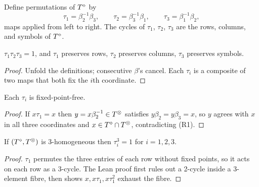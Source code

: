 \begin{definition}\label{def:tau}
  \leanok
  Define permutations of $T^{\diamond}$ by
  \[
    \tau_1 = \beta_2^{-1}\beta_3, \qquad
    \tau_2 = \beta_3^{-1}\beta_1, \qquad
    \tau_3 = \beta_1^{-1}\beta_2,
  \]
  maps applied from left to right. The cycles of $\tau_1$, $\tau_2$, $\tau_3$
  are the rows, columns, and symbols of $T^{\diamond}$.
\end{definition}

\begin{lemma}\label{lem:T1}
  \leanok
  $\tau_1\tau_2\tau_3 = 1$, and $\tau_1$ preserves rows, $\tau_2$ preserves
  columns, $\tau_3$ preserves symbols.
\end{lemma}
\begin{proof}\leanok
  Unfold the definitions; consecutive $\beta$'s cancel. Each $\tau_i$ is a
  composite of two maps that both fix the $i$th coordinate.
\end{proof}

\begin{lemma}\label{lem:T3}
  \leanok
  Each $\tau_i$ is fixed-point-free.
\end{lemma}
\begin{proof}\leanok
  If $x\tau_1 = x$ then $y = x\beta_2^{-1} \in T^{\otimes}$ satisfies
  $y\beta_2 = y\beta_3 = x$, so $y$ agrees with $x$ in all three
  coordinates and $x \in T^{\diamond} \cap T^{\otimes}$, contradicting (R1).
\end{proof}

\begin{lemma}\label{lem:order-three}
  \leanok
  If $(T^{\diamond}, T^{\otimes})$ is 3-homogeneous then $\tau_i^3 = 1$ for
  $i = 1, 2, 3$.
\end{lemma}
\begin{proof}\leanok
  $\tau_1$ permutes the three entries of each row without fixed points,
  so it acts on each row as a 3-cycle. The Lean proof first rules out a
  2-cycle inside a 3-element fibre, then shows $x, x\tau_1, x\tau_1^2$
  exhaust the fibre.
\end{proof}

